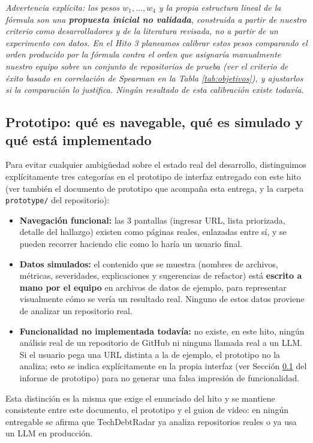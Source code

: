 \textit{Advertencia explícita: los pesos $w_1,\dots,w_4$ y la propia estructura lineal de la fórmula son una \textbf{propuesta inicial no validada}, construida a partir de nuestro criterio como desarrolladores y de la literatura revisada, no a partir de un experimento con datos. En el Hito 3 planeamos calibrar estos pesos comparando el orden producido por la fórmula contra el orden que asignaría manualmente nuestro equipo sobre un conjunto de repositorios de prueba (ver el criterio de éxito basado en correlación de Spearman en la Tabla \ref{tab:objetivos}), y ajustarlos si la comparación lo justifica. Ningún resultado de esta calibración existe todavía.}

\subsection{Prototipo: qué es navegable, qué es simulado y qué está implementado}
\label{sec:prototipo}

Para evitar cualquier ambigüedad sobre el estado real del desarrollo, distinguimos explícitamente tres categorías en el prototipo de interfaz entregado con este hito (ver también el documento de prototipo que acompaña esta entrega, y la carpeta \texttt{prototype/} del repositorio):

\begin{itemize}
    \item \textbf{Navegación funcional:} las 3 pantallas (ingresar URL, lista priorizada, detalle del hallazgo) existen como páginas reales, enlazadas entre sí, y se pueden recorrer haciendo clic como lo haría un usuario final.
    \item \textbf{Datos simulados:} el contenido que se muestra (nombres de archivos, métricas, severidades, explicaciones y sugerencias de refactor) está \textbf{escrito a mano por el equipo} en archivos de datos de ejemplo, para representar visualmente cómo se vería un resultado real. Ninguno de estos datos proviene de analizar un repositorio real.
    \item \textbf{Funcionalidad no implementada todavía:} no existe, en este hito, ningún análisis real de un repositorio de GitHub ni ninguna llamada real a un LLM. Si el usuario pega una URL distinta a la de ejemplo, el prototipo no la analiza; esto se indica explícitamente en la propia interfaz (ver Sección \ref{sec:prototipo} del informe de prototipo) para no generar una falsa impresión de funcionalidad.
\end{itemize}

Esta distinción es la misma que exige el enunciado del hito y se mantiene consistente entre este documento, el prototipo y el guion de video: en ningún entregable se afirma que TechDebtRadar ya analiza repositorios reales o ya usa un LLM en producción.

